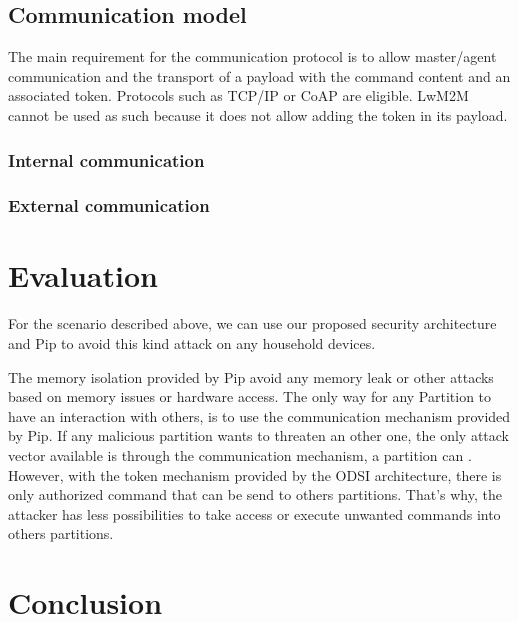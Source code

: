 \documentclass[conference]{IEEEtran}
\begin{document}
\subsection{Communication model}
\label{sec:Communication_model}
The main requirement for the communication protocol is to allow master/agent communication and the transport of a payload with the command content and an associated token. Protocols such as TCP/IP or CoAP are eligible. LwM2M \cite{oma_lwm2M_2017} cannot be used as such because it does not allow adding the token in its payload.

\subsubsection{Internal communication}
\subsubsection{External communication}


\section{Evaluation}

For the scenario described above\cite{Sivaraman2016}, we can use our proposed security architecture and Pip to avoid this kind attack on any household devices. 

The memory isolation provided by Pip avoid any memory leak or other attacks based on memory issues or hardware access. The only way for any Partition to have an interaction with others, is to use the communication mechanism provided by Pip. If any malicious partition wants to threaten an other one, the only attack vector available is through the communication mechanism, a partition can . However, with the token mechanism provided by the ODSI architecture, there is only authorized command that can be send to others partitions. That's why, the attacker has less possibilities to take access or execute unwanted commands into others partitions.




\section{Conclusion}
\end{document}

